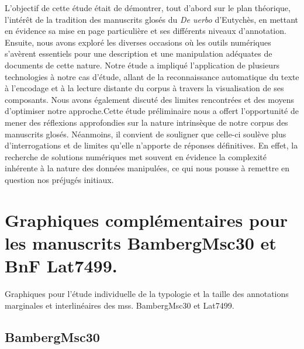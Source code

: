 \documentclass[a4paper, twoside, 12pt]{book}
\begin{document}
{L'objectif de cette étude était de démontrer, tout d'abord sur le plan théorique, l'intérêt de la tradition des manuscrits glosés du \textit{De uerbo} d'Eutychès, en mettant en évidence sa mise en page particulière et ses différents niveaux d'annotation. Ensuite, nous avons exploré les diverses occasions où les outils numériques s'avèrent essentiels pour une description et une manipulation adéquates de documents de cette nature. Notre étude a impliqué l'application de plusieurs technologies à notre cas d'étude, allant de la reconnaissance automatique du texte à l'encodage et à la lecture distante du corpus à travers la visualisation de ses composants. Nous avons également discuté des limites rencontrées et des moyens d'optimiser notre approche.Cette étude préliminaire nous a offert l'opportunité de mener des réflexions approfondies sur la nature intrinsèque de notre corpus des manuscrits glosés. Néanmoins, il convient de souligner que celle-ci soulève plus d'interrogations et de limites qu'elle n'apporte de réponses définitives. En effet, la recherche de solutions numériques met souvent en évidence la complexité inhérente à la nature des données manipulées, ce qui nous pousse à remettre en question nos préjugés initiaux.\\



\newpage
\nocite{*}
\printbibliography

\listoffigures

\appendix
\label{annexes}
\section{Graphiques complémentaires pour les manuscrits BambergMsc30 et BnF Lat7499.}

Graphiques pour l'étude individuelle de la typologie et la taille des annotations marginales et interlinéaires des mss. BambergMsc30 et Lat7499.\\

\subsection{BambergMsc30}

}
\end{document}
